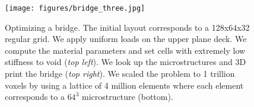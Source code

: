 		\begin{figure}
			\centering
			\texttt{[image: figures/bridge\_three.jpg]}
			\caption{Optimizing a bridge. The initial layout corresponds to a 128x64x32 regular grid. We apply uniform loads on the upper plane deck. We compute the material parameters and set cells with extremely low stiffness to void (\emph{top left}). We look up the microstructures and 3D print the bridge (\emph{top right}). We scaled the problem to 1 trillion voxels by using a lattice of 4 million elements where each element corresponds to a $64^3$ microstructure (bottom).
				\label{fig:bridge}}
		\end{figure}